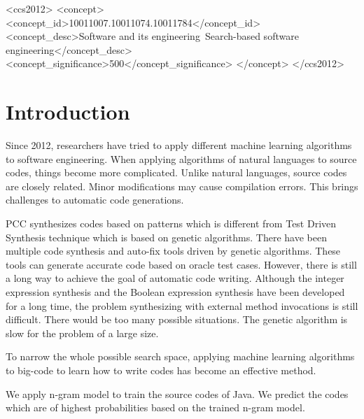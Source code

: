 \documentclass{sig-alternate-05-2015}
\begin{document}
\begin{CCSXML}
<ccs2012>
<concept>
<concept_id>10011007.10011074.10011784</concept_id>
<concept_desc>Software and its engineering~Search-based software engineering</concept_desc>
<concept_significance>500</concept_significance>
</concept>
</ccs2012>
\end{CCSXML}
\printccsdesc

\vspace{-0.1cm}

\section{Introduction}

Since 2012, researchers have tried to apply different machine learning algorithms to software engineering. When applying algorithms of natural languages to source codes, things become more complicated. Unlike natural languages, source codes are closely related. Minor modifications may cause compilation errors. This brings challenges to automatic code generations.

PCC synthesizes codes based on patterns which is different from Test Driven Synthesis technique which is based on genetic algorithms. There have been multiple code synthesis and auto-fix tools \cite{DBLP:conf/icse/WeimerNGF09}\cite{nguyen2013semfix}\cite{perelman2014test} driven by genetic algorithms. These tools can generate accurate code based on oracle test cases. However, there is still a long way to achieve the goal of automatic code writing. Although the integer expression synthesis and the Boolean expression synthesis have been developed for a long time, the problem synthesizing with external method invocations is still difficult. There would be too many possible situations. The genetic algorithm is slow for the problem of a large size.

To narrow the whole possible search space, applying machine learning algorithms to big-code to learn how to write codes has become an effective method.

We apply n-gram model to train the source codes of Java. We predict the codes which are of highest probabilities based on the trained n-gram model.

\end{document}
